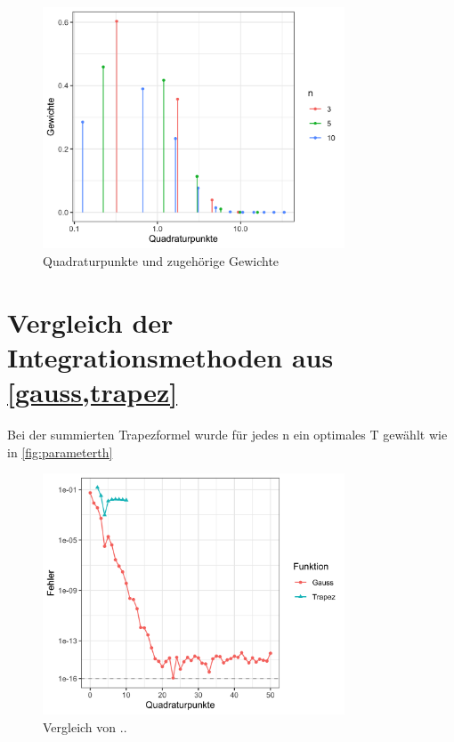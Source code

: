 \documentclass[12pt,a4paper]{scrartcl}
\numberwithin{equation}{section}
\numberwithin{myalgctr}{section}
\numberwithin{mytheoremctr}{section}
\numberwithin{mykorollarctr}{section}
\numberwithin{mylemmactr}{section}
\numberwithin{mybeispielctr}{section}
\begin{document}
	\begin{figure}[H]
		\begin{center}
			\includegraphics[width=0.8\textwidth]{../plots/quadraturpunkte-n-zusammen.png}
		\end{center}
		\caption{Quadraturpunkte und zugeh\"orige Gewichte}
		\label{fig:quadraturpunkte}
	\end{figure}
	
	\newpage
	\section{Vergleich der Integrationsmethoden aus \cref{gauss,trapez}}
	Bei der summierten Trapezformel wurde für jedes n ein optimales T gewählt wie in \cref{fig:parameterth}
	\begin{figure}[H]
		\begin{center}
			\includegraphics[width=0.8\textwidth]{../plots/aufgabe-e2.png}
		\end{center}
		\caption{Vergleich von ..}
		\label{fig:vergleich}	
	\end{figure}
\end{document}
